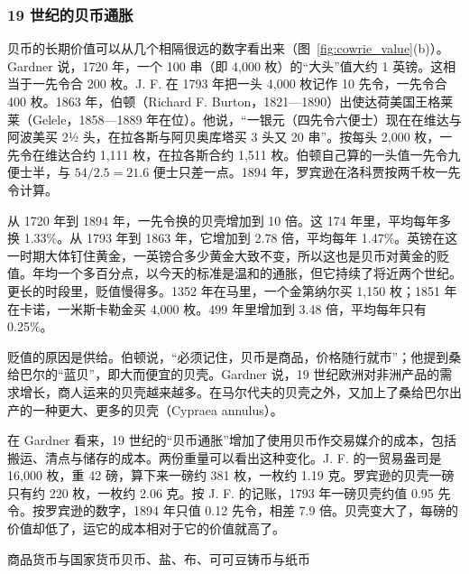 \subsubsection{19 世纪的贝币通胀}
贝币的长期价值可以从几个相隔很远的数字看出来（图~\ref{fig:cowrie_value}(b)）。Gardner 说，1720 年，一个 100 串（即 4,000 枚）的“大头”值大约 1 英镑\cite{gardner2015}。这相当于一先令合 200 枚。J. F. 在 1793 年把一头 4,000 枚记作 10 先令，一先令合 400 枚。1863 年，伯顿（Richard F. Burton，1821—1890）出使达荷美国王格莱莱（Gelele，1858—1889 年在位）。他说，“一银元（四先令六便士）现在在维达与阿波美买 2½ 头，在拉各斯与阿贝奥库塔买 3 头又 20 串”\cite{burton1864}。按每头 2,000 枚，一先令在维达合约 1,111 枚，在拉各斯合约 1,511 枚。伯顿自己算的一头值一先令九便士半，与 $54/2.5=21.6$ 便士只差一点。1894 年，罗宾逊在洛科贾按两千枚一先令计算。

从 1720 年到 1894 年，一先令换的贝壳增加到 10 倍。这 174 年里，平均每年多换 1.33\%。从 1793 年到 1863 年，它增加到 2.78 倍，平均每年 1.47\%。英镑在这一时期大体钉住黄金，一英镑合多少黄金大致不变，所以这也是贝币对黄金的贬值。年均一个多百分点，以今天的标准是温和的通胀，但它持续了将近两个世纪。更长的时段里，贬值慢得多。1352 年在马里，一个金第纳尔买 1,150 枚；1851 年在卡诺，一米斯卡勒金买 4,000 枚。499 年里增加到 3.48 倍，平均每年只有 0.25\%。

贬值的原因是供给。伯顿说，“必须记住，贝币是商品，价格随行就市”；他提到桑给巴尔的“蓝贝”，即大而便宜的贝壳\cite{burton1864}。Gardner 说，19 世纪欧洲对非洲产品的需求增长，商人运来的贝壳越来越多。在马尔代夫的贝壳之外，又加上了桑给巴尔出产的一种更大、更多的贝壳（Cypraea annulus）\cite{gardner2015}。

在 Gardner 看来，19 世纪的“贝币通胀”增加了使用贝币作交易媒介的成本，包括搬运、清点与储存的成本。两份重量可以看出这种变化。J. F. 的一贸易盎司是 16,000 枚，重 42 磅，算下来一磅约 381 枚，一枚约 1.19 克。罗宾逊的贝壳一磅只有约 220 枚，一枚约 2.06 克。按 J. F. 的记账，1793 年一磅贝壳约值 0.95 先令。按罗宾逊的数字，1894 年只值 0.12 先令，相差 7.9 倍。贝壳变大了，每磅的价值却低了，运它的成本相对于它的价值就高了。

\begin{compare}{商品货币与国家货币}{贝币、盐、布、可可豆}{铸币与纸币}
\end{compare}

